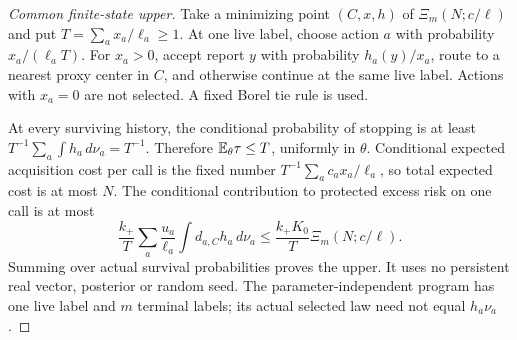 \begin{proof}[Common finite-state upper]
Take a minimizing point $(C,x,h)$ of $\Xi_m(N;c/\ell)$ and put $T=\sum_a x_a/\ell_a\ge1$. At one live label, choose action $a$ with probability $x_a/(\ell_aT)$. For $x_a>0$, accept report $y$ with probability $h_a(y)/x_a$, route to a nearest proxy center in $C$, and otherwise continue at the same live label. Actions with $x_a=0$ are not selected. A fixed Borel tie rule is used.

At every surviving history, the conditional probability of stopping is at least
$T^{-1}\sum_a\int h_a\,d\nu_a=T^{-1}$. Therefore $\mathbb E_\theta\tau\le T$, uniformly in $\theta$. Conditional expected acquisition cost per call is the fixed number $T^{-1}\sum_ac_ax_a/\ell_a$, so total expected cost is at most $N$. The conditional contribution to protected excess risk on one call is at most
\[
 \frac{k_+}{T}\sum_a\frac{u_a}{\ell_a}\int d_{a,C}h_a\,d\nu_a
 \le \frac{k_+K_0}{T}\Xi_m(N;c/\ell).
\]
Summing over actual survival probabilities proves the upper. It uses no persistent real vector, posterior or random seed. The parameter-independent program has one live label and $m$ terminal labels; its actual selected law need not equal $h_a\nu_a$.
\end{proof}

